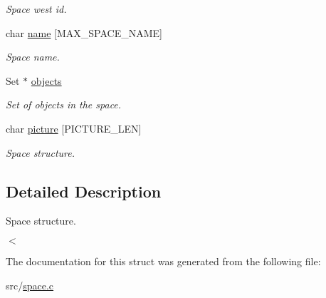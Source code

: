 \begin{DoxyCompactItemize}
\begin{DoxyCompactList}\small\item\em Space west id. \end{DoxyCompactList}\item 
\mbox{\label{struct__Space_ad69773f9a031624255530244436a211f}} 
char \hyperlink{struct__Space_ad69773f9a031624255530244436a211f}{name} \mbox{[}M\+A\+X\+\_\+\+S\+P\+A\+C\+E\+\_\+\+N\+A\+ME\mbox{]}
\begin{DoxyCompactList}\small\item\em Space name. \end{DoxyCompactList}\item 
\mbox{\label{struct__Space_a661ed8b0fc8085b6db70188aa5085625}} 
Set $\ast$ \hyperlink{struct__Space_a661ed8b0fc8085b6db70188aa5085625}{objects}
\begin{DoxyCompactList}\small\item\em Set of objects in the space. \end{DoxyCompactList}\item 
\mbox{\label{struct__Space_ab4b3f4af835727b6afe807d2aded4ff2}} 
char \hyperlink{struct__Space_ab4b3f4af835727b6afe807d2aded4ff2}{picture} \mbox{[}P\+I\+C\+T\+U\+R\+E\+\_\+\+L\+EN\mbox{]}
\begin{DoxyCompactList}\small\item\em Space structure. \end{DoxyCompactList}\end{DoxyCompactItemize}


\subsection{Detailed Description}
Space structure. 

$<$ 

The documentation for this struct was generated from the following file\+:\begin{DoxyCompactItemize}
\item 
src/\hyperlink{space_8c}{space.\+c}\end{DoxyCompactItemize}
